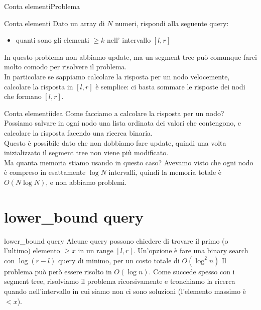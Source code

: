 \documentclass[compress]{beamer}
\begin{document}
\begin{frame}{Conta elementi}{Problema}
    \begin{exampleblock}{Conta elementi}
        Dato un array di $N$ numeri, rispondi alla seguente query:
        \begin{itemize}
            \item quanti sono gli elementi $\ge k$ nell' intervallo $[l, r]$
        \end{itemize}
    \end{exampleblock}
    \pause
    In questo problema non abbiamo update, ma un segment tree può comunque farci molto comodo per risolvere il problema.\\
    \pause
    In particolare se sappiamo calcolare la risposta per un nodo velocemente, calcolare la risposta in $[l, r]$ è semplice: ci basta 
    sommare le risposte dei nodi che formano $[l, r]$.
\end{frame}

\begin{frame}{Conta elementi}{idea}
    Come facciamo a calcolare la risposta per un nodo?\\
    \pause
    Possiamo salvare in ogni nodo una lista ordinata dei valori che contengono, e calcolare la risposta facendo una ricerca binaria.\\
    \pause
    Questo è possibile dato che non dobbiamo fare update, quindi una volta inizializzato il segment tree non viene più modificato.\\
    \pause
    Ma quanta memoria stiamo usando in questo caso? Avevamo visto che ogni nodo è compreso in esattamente $\log N$ intervalli, 
    quindi la memoria totale è $O(N \log N)$, e non abbiamo problemi.
\end{frame}

\section{lower\_bound query}
\begin{frame}{lower\_bound query}
    Alcune query possono chiedere di trovare il primo (o l'ultimo) elemento $\geq x$ in un range $[l, r]$.
    \pause
    \vfill
    Un'opzione \`e fare una binary search con $\log (r-l)$ query di minimo, per un costo totale di $O(\log^2 n)$
    \pause
    \vfill
    Il problema pu\`o per\`o essere risolto in $O(\log n)$. Come succede spesso con i segment tree, risolviamo il problema ricorsivamente e tronchiamo la ricerca quando nell'intervallo in cui siamo non ci sono soluzioni (l'elemento massimo \`e $< x$).
    \vfill
\end{frame}
\end{document}
